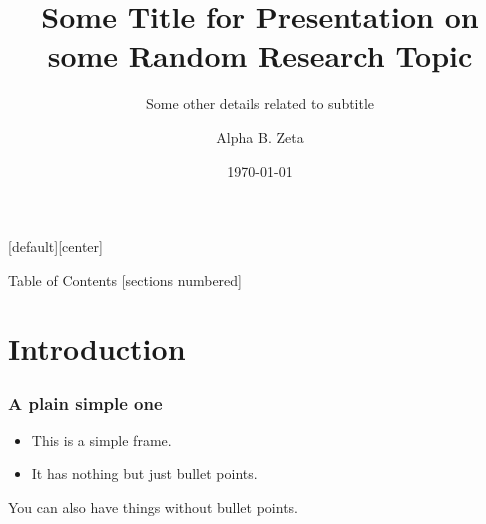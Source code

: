 \documentclass[10pt,xcolor=table]{beamer}
\title[A shorter title]{Some Title for Presentation on some Random Research Topic}
\subtitle[test]{Some other details related to subtitle}
\date{\today}
\author[alphazeta@bu.edu]{Alpha B. Zeta}
\institute[SPTL, BU]{Center for Space Physics, Boston University}
\begin{document}
{
\maketitle
}

[default][center]

\begin{frame}[plain]{Table of Contents}
  [sections numbered]
  \tableofcontents[hideallsubsections]
\end{frame}

\section{Introduction}
\begin{frame}
  \frametitle{A plain simple one}
  \begin{itemize}
  \item This is a simple frame.
  \item It has nothing but just bullet points.
  \end{itemize}
  You can also have things without bullet points.
\end{frame}
\end{document}
